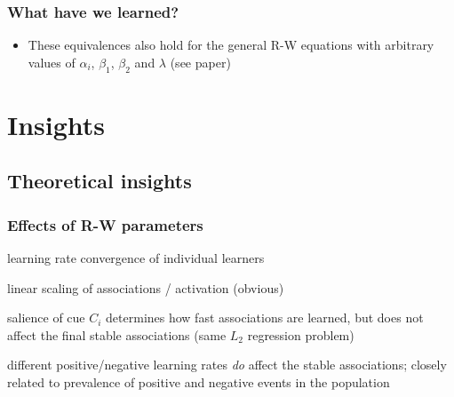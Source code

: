 \documentclass[t]{beamer} %
\begin{document}
\begin{frame}[c]
  \frametitle{What have we learned?}

  \begin{center}\Large
    \setlength{\fboxrule}{2pt}
  \end{center}
  \begin{itemize}
  \item[\hand] These equivalences also hold for the general R-W equations with arbitrary values of $\alpha_i$, $\beta_1$, $\beta_2$ and $\lambda$ (see paper)
  \end{itemize}
  
\end{frame}


\section{Insights}

\subsection{Theoretical insights}

\begin{frame}
  \frametitle{Effects of R-W parameters}

  \begin{description}
  \item<1->[$\beta > 0$:] learning rate \so convergence of individual learners
  \item<2->[$\lambda \neq 1$:]\gap[.5] linear scaling of associations / activation (obvious)
  \item<3->[$\alpha_i\neq 1$:]\gap[.5] salience of cue $C_i$ determines how fast associations are learned, but does not affect the final stable associations (same $L_2$ regression problem)
  \item<4->[$\beta_1 \neq \beta_2$:]\gap[.5] different positive/negative learning rates \emph{do} affect the stable associations; closely related to prevalence of positive and negative events in the population
  \end{description}
\end{frame}
\end{document}
